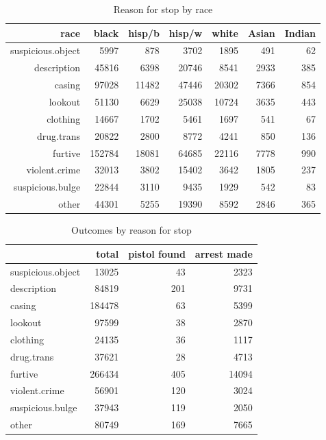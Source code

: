 \documentclass[letterpaper]{exam}
\begin{document}
  \begin{table}[H]
    \centering
    \begin{tabular}{rrrrrrr}
      \toprule
      race              & black  & hisp/b & hisp/w & white & Asian & Indian \\
      \midrule
      suspicious.object & 5997   & 878    & 3702   & 1895  & 491   & 62 \\
      description       & 45816  & 6398   & 20746  & 8541  & 2933  & 385 \\
      casing            & 97028  & 11482  & 47446  & 20302 & 7366  & 854 \\
      lookout           & 51130  & 6629   & 25038  & 10724 & 3635  & 443 \\
      clothing          & 14667  & 1702   & 5461   & 1697  & 541   & 67 \\
      drug.trans        & 20822  & 2800   & 8772   & 4241  & 850   & 136 \\
      furtive           & 152784 & 18081  & 64685  & 22116 & 7778  & 990 \\
      violent.crime     & 32013  & 3802   & 15402  & 3642  & 1805  & 237 \\
      suspicious.bulge  & 22844  & 3110   & 9435   & 1929  & 542   & 83 \\
      other             & 44301  & 5255   & 19390  & 8592  & 2846  & 365 \\
      \bottomrule
    \end{tabular}
    \caption{Reason for stop by race}
  \end{table}

  \begin{table}[H]
    \centering
    \begin{tabular}{lrrr}
      \toprule
                          & total  & pistol found & arrest made \\
      \midrule
      suspicious.object   & 13025  & 43           & 2323 \\
      description         & 84819  & 201          & 9731 \\
      casing              & 184478 & 63           & 5399 \\
      lookout             & 97599  & 38           & 2870 \\
      clothing            & 24135  & 36           & 1117 \\
      drug.trans          & 37621  & 28           & 4713 \\
      furtive             & 266434 & 405          & 14094 \\
      violent.crime       & 56901  & 120          & 3024 \\
      suspicious.bulge    & 37943  & 119          & 2050 \\
      other               & 80749  & 169          & 7665 \\
       \bottomrule
    \end{tabular}
    \caption{Outcomes by reason for stop}
  \end{table}
\end{document}
